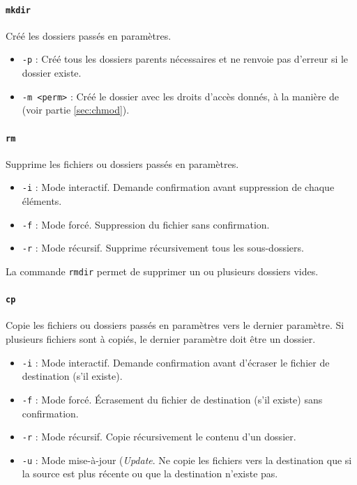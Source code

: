 \paragraph{\texttt{mkdir}} 
Créé les dossiers passés en paramètres.
\begin{itemize}
    \item \texttt{-p} : Créé tous les dossiers parents nécessaires et ne renvoie pas d'erreur si le dossier existe.
    \item \texttt{-m <perm>} : Créé le dossier avec les droits d'accès donnés, à la manière de  (voir partie \ref{sec:chmod}).
\end{itemize}

\paragraph{\texttt{rm}} 
Supprime les fichiers ou dossiers passés en paramètres.
\begin{itemize}
    \item \texttt{-i} : Mode interactif. Demande confirmation avant suppression de chaque éléments.
    \item \texttt{-f} : Mode forcé. Suppression du fichier sans confirmation.
    \item \texttt{-r} : Mode récursif. Supprime récursivement tous les sous-dossiers.
\end{itemize}

 La commande \texttt{rmdir}  permet de supprimer un ou plusieurs dossiers vides.

\newpage

\paragraph{\texttt{cp}} 
Copie les fichiers ou dossiers passés en paramètres vers le dernier paramètre. Si plusieurs fichiers sont à copiés, le dernier paramètre doit être un dossier.
\begin{itemize}
    \item \texttt{-i} : Mode interactif. Demande confirmation avant d'écraser le fichier de destination (s'il existe).
    \item \texttt{-f} : Mode forcé. Écrasement du fichier de destination (s'il existe) sans confirmation.
    \item \texttt{-r} : Mode récursif. Copie récursivement le contenu d'un dossier.
    \item \texttt{-u} : Mode mise-à-jour (\textit{Update}. Ne copie les fichiers vers la destination que si la source est plus récente ou que la destination n'existe pas.
\end{itemize}

